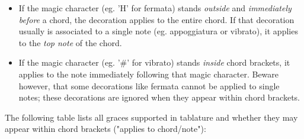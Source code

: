 \documentclass[a4paper]{article}
\begin{document}
\begin{itemize}
\item If the magic character (eg. 'H' for fermata) stands {\it outside}
    and {\it immediately before} a chord, the decoration applies to the 
    entire chord. If that decoration usually is associated to a single
    note (eg. appoggiatura or vibrato), it applies to the {\it top note}
    of the chord.
\item If the magic character (eg. '\#' for vibrato) stands {\it inside}
    chord brackets, it applies to the note immediately following that
    magic character. Beware however, that some decorations like fermata 
    cannot be applied to single notes; these decorations are ignored 
    when they appear within chord brackets.
\end{itemize}

The following table lists all graces supported in tablature and whether
they may appear within chord brackets ("applies to chord/note"):
\end{document}
